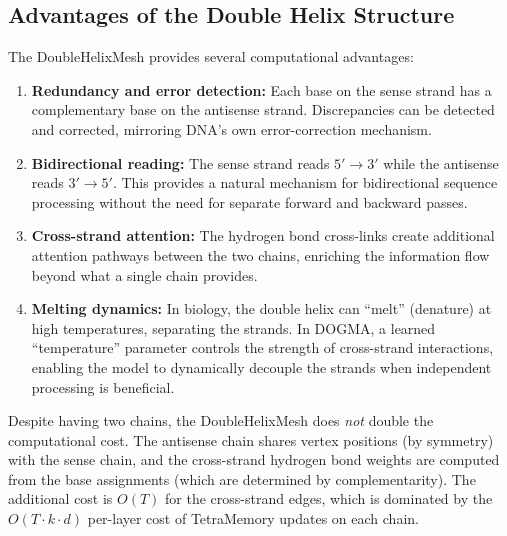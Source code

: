 \subsection{Advantages of the Double Helix Structure}

The DoubleHelixMesh provides several computational advantages:

\begin{enumerate}[leftmargin=2em]
  \item \textbf{Redundancy and error detection:} Each base on the sense strand
        has a complementary base on the antisense strand. Discrepancies can be
        detected and corrected, mirroring DNA's own error-correction mechanism.

  \item \textbf{Bidirectional reading:} The sense strand reads $5' \to 3'$ while
        the antisense reads $3' \to 5'$. This provides a natural mechanism for
        bidirectional sequence processing without the need for separate forward
        and backward passes.

  \item \textbf{Cross-strand attention:} The hydrogen bond cross-links create
        additional attention pathways between the two chains, enriching the
        information flow beyond what a single chain provides.

  \item \textbf{Melting dynamics:} In biology, the double helix can ``melt''
        (denature) at high temperatures, separating the strands. In DOGMA, a
        learned ``temperature'' parameter controls the strength of cross-strand
        interactions, enabling the model to dynamically decouple the strands
        when independent processing is beneficial.
\end{enumerate}

\begin{implnote}
Despite having two chains, the DoubleHelixMesh does \emph{not} double the
computational cost. The antisense chain shares vertex positions (by symmetry)
with the sense chain, and the cross-strand hydrogen bond weights are computed
from the base assignments (which are determined by complementarity). The
additional cost is $O(T)$ for the cross-strand edges, which is dominated by
the $O(T \cdot k \cdot d)$ per-layer cost of TetraMemory updates on each chain.
\end{implnote}

